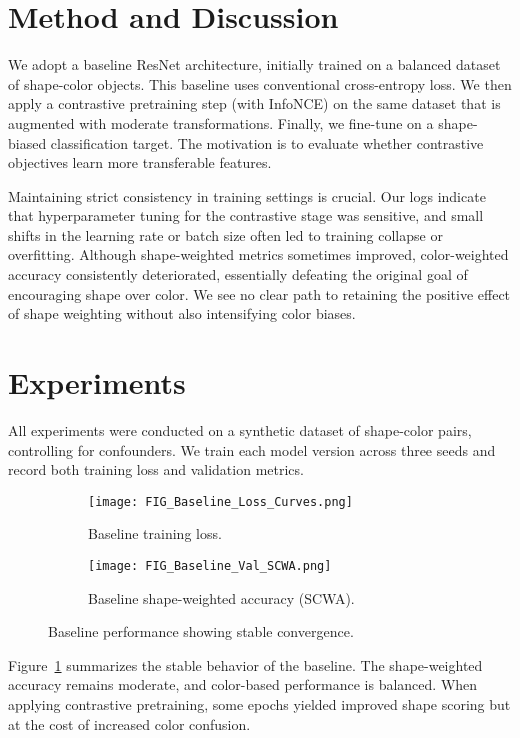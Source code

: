 \documentclass{article}
\begin{document}
\section{Method and Discussion}
We adopt a baseline ResNet architecture, initially trained on a balanced dataset of shape-color objects. This baseline uses conventional cross-entropy loss. We then apply a contrastive pretraining step (with InfoNCE) on the same dataset that is augmented with moderate transformations. Finally, we fine-tune on a shape-biased classification target. The motivation is to evaluate whether contrastive objectives learn more transferable features.

Maintaining strict consistency in training settings is crucial. Our logs indicate that hyperparameter tuning for the contrastive stage was sensitive, and small shifts in the learning rate or batch size often led to training collapse or overfitting. Although shape-weighted metrics sometimes improved, color-weighted accuracy consistently deteriorated, essentially defeating the original goal of encouraging shape over color. We see no clear path to retaining the positive effect of shape weighting without also intensifying color biases.

\section{Experiments}
All experiments were conducted on a synthetic dataset of shape-color pairs, controlling for confounders. We train each model version across three seeds and record both training loss and validation metrics.

\begin{figure}[t]
\centering
\begin{subfigure}{0.49\linewidth}
\texttt{[image: FIG\_Baseline\_Loss\_Curves.png]}
\caption{Baseline training loss.}
\end{subfigure}
\hfill
\begin{subfigure}{0.49\linewidth}
\texttt{[image: FIG\_Baseline\_Val\_SCWA.png]}
\caption{Baseline shape-weighted accuracy (SCWA).}
\end{subfigure}
\caption{Baseline performance showing stable convergence.}
\label{fig:baseline}
\end{figure}

Figure~\ref{fig:baseline} summarizes the stable behavior of the baseline. The shape-weighted accuracy remains moderate, and color-based performance is balanced. When applying contrastive pretraining, some epochs yielded improved shape scoring but at the cost of increased color confusion.
\end{document}
